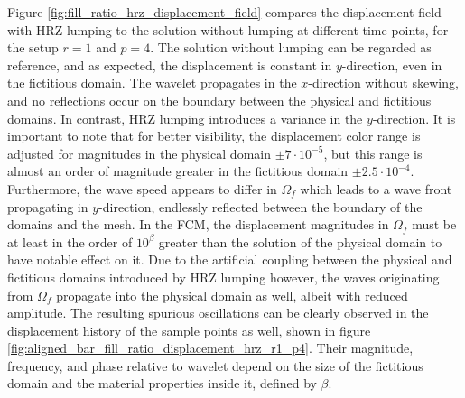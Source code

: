 Figure \ref{fig:fill_ratio_hrz_displacement_field} compares the displacement field with HRZ lumping to the solution without lumping at different time points, for the setup $r=1$ and $p=4$. The solution without lumping can be regarded as reference, and as expected, the displacement is constant in $y$-direction, even in the fictitious domain. The wavelet propagates in the $x$-direction without skewing, and no reflections occur on the boundary between the physical and fictitious domains. 
In contrast, HRZ lumping introduces a variance in the $y$-direction. It is important to note that for better visibility, the displacement color range is adjusted for magnitudes in the physical domain $\pm 7\cdot 10^{-5}$, but this range is almost an order of magnitude greater in the fictitious domain $\pm 2.5 \cdot 10^{-4}$.
Furthermore, the wave speed appears to differ in $\Omega_f$ which leads to a wave front propagating in $y$-direction, endlessly reflected between the boundary of the domains and the mesh. 
In the FCM, the displacement magnitudes in $\Omega_f$ must be at least in the order of $10^{\beta}$ greater than the solution of the physical domain to have notable effect on it.
Due to the artificial coupling between the physical and fictitious domains introduced by HRZ lumping however, the waves originating from $\Omega_f$ propagate into the physical domain as well, albeit with reduced amplitude. The resulting spurious oscillations can be clearly observed in the displacement history of the sample points as well, shown in figure \ref{fig:aligned_bar_fill_ratio_displacement_hrz_r1_p4}. Their magnitude, frequency, and phase relative to wavelet depend on the size of the fictitious domain and the material properties inside it, defined by $\beta$.

